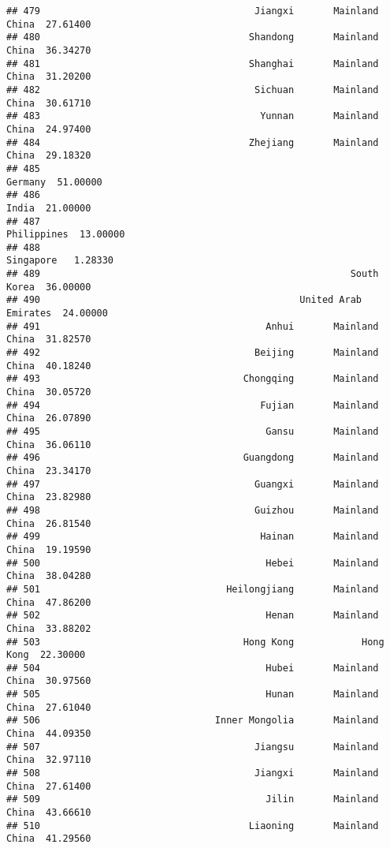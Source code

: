 \documentclass[
]{article}
\begin{document}
\begin{verbatim}
## 479                                      Jiangxi       Mainland China  27.61400
## 480                                     Shandong       Mainland China  36.34270
## 481                                     Shanghai       Mainland China  31.20200
## 482                                      Sichuan       Mainland China  30.61710
## 483                                       Yunnan       Mainland China  24.97400
## 484                                     Zhejiang       Mainland China  29.18320
## 485                                                           Germany  51.00000
## 486                                                             India  21.00000
## 487                                                       Philippines  13.00000
## 488                                                         Singapore   1.28330
## 489                                                       South Korea  36.00000
## 490                                              United Arab Emirates  24.00000
## 491                                        Anhui       Mainland China  31.82570
## 492                                      Beijing       Mainland China  40.18240
## 493                                    Chongqing       Mainland China  30.05720
## 494                                       Fujian       Mainland China  26.07890
## 495                                        Gansu       Mainland China  36.06110
## 496                                    Guangdong       Mainland China  23.34170
## 497                                      Guangxi       Mainland China  23.82980
## 498                                      Guizhou       Mainland China  26.81540
## 499                                       Hainan       Mainland China  19.19590
## 500                                        Hebei       Mainland China  38.04280
## 501                                 Heilongjiang       Mainland China  47.86200
## 502                                        Henan       Mainland China  33.88202
## 503                                    Hong Kong            Hong Kong  22.30000
## 504                                        Hubei       Mainland China  30.97560
## 505                                        Hunan       Mainland China  27.61040
## 506                               Inner Mongolia       Mainland China  44.09350
## 507                                      Jiangsu       Mainland China  32.97110
## 508                                      Jiangxi       Mainland China  27.61400
## 509                                        Jilin       Mainland China  43.66610
## 510                                     Liaoning       Mainland China  41.29560

\end{verbatim}
\end{document}
